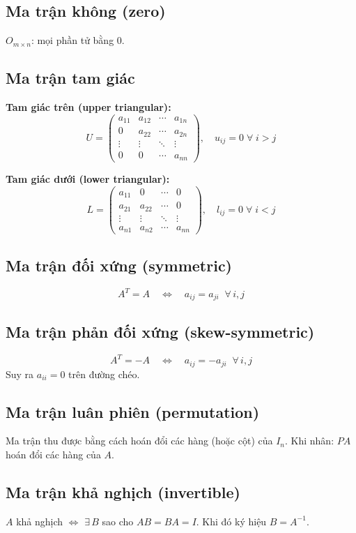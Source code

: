 \subsection{Ma trận không (zero)}
$O_{m \times n}$: mọi phần tử bằng $0$.

\subsection{Ma trận tam giác}
\textbf{Tam giác trên (upper triangular):}
\[
U = \begin{pmatrix}
a_{11} & a_{12} & \cdots & a_{1n} \\
0 & a_{22} & \cdots & a_{2n} \\
\vdots & \vdots & \ddots & \vdots \\
0 & 0 & \cdots & a_{nn}
\end{pmatrix}, \quad u_{ij} = 0 \;\forall\; i > j
\]

\textbf{Tam giác dưới (lower triangular):}
\[
L = \begin{pmatrix}
a_{11} & 0 & \cdots & 0 \\
a_{21} & a_{22} & \cdots & 0 \\
\vdots & \vdots & \ddots & \vdots \\
a_{n1} & a_{n2} & \cdots & a_{nn}
\end{pmatrix}, \quad l_{ij} = 0 \;\forall\; i < j
\]

\subsection{Ma trận đối xứng (symmetric)}
\[
A^T = A \quad \Longleftrightarrow \quad a_{ij} = a_{ji} \;\;\forall\, i,j
\]

\subsection{Ma trận phản đối xứng (skew-symmetric)}
\[
A^T = -A \quad \Longleftrightarrow \quad a_{ij} = -a_{ji} \;\;\forall\, i,j
\]
Suy ra $a_{ii} = 0$ trên đường chéo.

\subsection{Ma trận luân phiên (permutation)}
Ma trận thu được bằng cách hoán đổi các hàng (hoặc cột) của $I_n$. Khi nhân: $PA$ hoán đổi các hàng của $A$.

\subsection{Ma trận khả nghịch (invertible)}
$A$ khả nghịch $\Longleftrightarrow$ $\exists\, B$ sao cho $AB = BA = I$. Khi đó ký hiệu $B = A^{-1}$.

